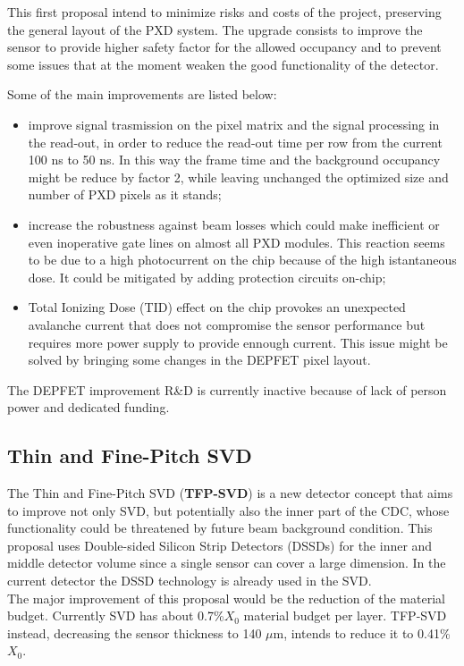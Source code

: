 This first proposal intend to minimize risks and costs of the project, preserving the general layout of the PXD system. The upgrade consists to improve the sensor to provide higher safety factor for the allowed occupancy and to prevent some issues that at the moment weaken the good functionality of the detector.

Some of the main improvements are listed below:

\begin{itemize}
\item improve signal trasmission on the pixel matrix and the signal processing in the read-out, in order to reduce the read-out time per row from the current 100 ns to 50 ns. In this way the frame time and the background occupancy might be reduce by factor 2, while leaving unchanged the optimized size and number of PXD pixels as it stands;
\item increase the robustness against beam losses which could make inefficient or even inoperative gate lines on almost all PXD modules. This reaction seems to be due to a high photocurrent on the chip because of the high istantaneous dose. It could be mitigated by adding protection circuits on-chip;
\item Total Ionizing Dose (TID) effect on the chip provokes an unexpected avalanche current that does not compromise the sensor performance but requires more power supply to provide ennough current. This issue might be solved by bringing some changes in the DEPFET pixel layout.
\end{itemize}

The DEPFET improvement R\&D is currently inactive because of lack of person power and dedicated funding.

\subsection{Thin and Fine-Pitch SVD}

The Thin and Fine-Pitch SVD (\textbf{TFP-SVD}) is a new detector concept that aims to improve not only SVD, but potentially also the inner part of the CDC, whose functionality could be threatened by future beam background condition.
This proposal uses Double-sided Silicon Strip Detectors (DSSDs) for the inner and middle detector volume since a single sensor can cover a large dimension. In the current detector the DSSD technology is already used in the SVD. \\

The major improvement of this proposal would be the reduction of the material budget.
Currently SVD has about 0.7\%$X_{0}$ material budget per layer. TFP-SVD instead, decreasing the sensor thickness to 140 $\mu$m, intends to reduce it to 0.41\%$X_{0}$. 

